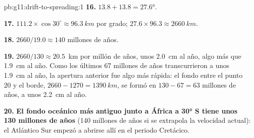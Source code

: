 \begin{solution}{pb:g11:drift-to-spreading:1}
\textbf{16.} $13.8 + 13.8 = \ang{27.6}$.

\textbf{17.} $111.2 \times \cos 30^\circ \approx \qty{96.3}{km}$ por grado;
$27.6 \times 96.3 \approx \qty{2660}{km}$.

\textbf{18.} $2660/19.0 \approx 140$ millones de años.

\textbf{19.} $2660/130 \approx \num{20.5}$~km por millón de años, unos
\qty{2.0}{cm} al año, algo más que \qty{1.9}{cm} al año. Como los últimos 67
millones de años transcurrieron a unos \qty{1.9}{cm} al año, la apertura
anterior fue algo más rápida: el fondo entre el punto 20 y el borde,
$2660 - 1270 =
\qty{1390}{km}$, se formó en $130 - 67 = 63$ millones de años,
a unos \qty{2.2}{cm} al año.

\textbf{20.} \textbf{El fondo oceánico más antiguo junto a África a \ang{30} S
tiene unos 130 millones de años} (140 millones de años si se extrapola la
velocidad actual): el Atlántico Sur empezó a abrirse allí en el periodo
Cretácico.
\end{solution}
